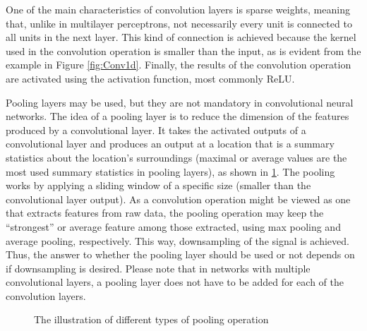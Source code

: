 One of the main characteristics of convolution layers is sparse weights, meaning that, unlike in multilayer perceptrons, not necessarily every unit is connected to all units in the next layer. This kind of connection is achieved because the kernel used in the convolution operation is smaller than the input, as is evident from the example in Figure \ref{fig:Conv1d}. Finally, the results of the convolution operation are activated using the activation function, most commonly ReLU.

Pooling layers may be used, but they are not mandatory in convolutional neural networks. The idea of a pooling layer is to reduce the dimension of the features produced by a convolutional layer. It takes the activated outputs of a convolutional layer and produces an output at a location that is a summary statistics about the location's surroundings (maximal or average values are the most used summary statistics in pooling layers), as shown in \cref{fig:Pooling}. The pooling works by applying a sliding window of a specific size (smaller than the convolutional layer output). As a convolution operation might be viewed as one that extracts features from raw data, the pooling operation may keep the ``strongest'' or average feature among those extracted, using max pooling and average pooling, respectively. This way, downsampling of the signal is achieved. Thus, the answer to whether the pooling layer should be used or not depends on if downsampling is desired. Please note that in networks with multiple convolutional layers, a pooling layer does not have to be added for each of the convolution layers.

\begin{figure}
    \centering
    \vfill
    \caption{The illustration of different types of pooling operation}
    \label{fig:Pooling}
\end{figure}


